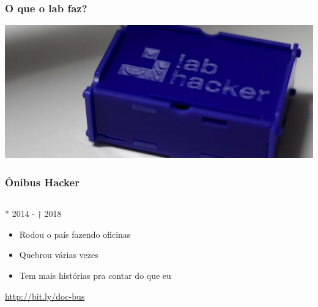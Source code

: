 \documentclass{beamer}
\newlength\beamerleftmargin
\begin{document}
\begin{frame}
  \frametitle{O que o lab faz?}
  \hspace*{-\beamerleftmargin}%
  \includegraphics[width=\paperwidth]{labcaixinha}
\end{frame}

\begin{frame}
  \frametitle{Ônibus Hacker}
  \begin{columns}
    \begin{column}{0.5\textwidth}
      * 2014 - † 2018
      \begin{itemize}
        \item Rodou o país fazendo oficinas
        \item Quebrou várias vezes
        \item Tem mais histórias pra contar do que eu
      \end{itemize}
      \url{http://bit.ly/doc-bus}
    \end{column}
    \begin{column}{0.5\textwidth}
    \end{column}
  \end{columns}
\end{frame}
\end{document}
